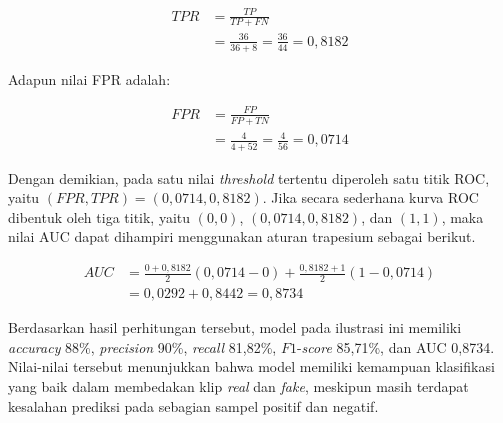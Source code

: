 \begin{align*}
TPR &= \frac{TP}{TP + FN} \\
&= \frac{36}{36 + 8} = \frac{36}{44} = 0{,}8182
\end{align*}
\par

Adapun nilai FPR adalah: \par

\begin{align*}
FPR &= \frac{FP}{FP + TN} \\
&= \frac{4}{4 + 52} = \frac{4}{56} = 0{,}0714
\end{align*}
\par

Dengan demikian, pada satu nilai \textit{threshold} tertentu diperoleh satu titik ROC, yaitu $(FPR, TPR) = (0{,}0714, 0{,}8182)$. Jika secara sederhana kurva ROC dibentuk oleh tiga titik, yaitu $(0,0)$, $(0{,}0714, 0{,}8182)$, dan $(1,1)$, maka nilai AUC dapat dihampiri menggunakan aturan trapesium sebagai berikut. \par

\begin{align*}
AUC &= \frac{0 + 0{,}8182}{2}(0{,}0714 - 0) + \frac{0{,}8182 + 1}{2}(1 - 0{,}0714) \\
&= 0{,}0292 + 0{,}8442 = 0{,}8734
\end{align*}
\par
\endgroup

Berdasarkan hasil perhitungan tersebut, model pada ilustrasi ini memiliki \textit{accuracy} 88\%, \textit{precision} 90\%, \textit{recall} 81{,}82\%, $F1$-\textit{score} 85{,}71\%, dan AUC 0{,}8734. Nilai-nilai tersebut menunjukkan bahwa model memiliki kemampuan klasifikasi yang baik dalam membedakan klip \textit{real} dan \textit{fake}, meskipun masih terdapat kesalahan prediksi pada sebagian sampel positif dan negatif. \par

